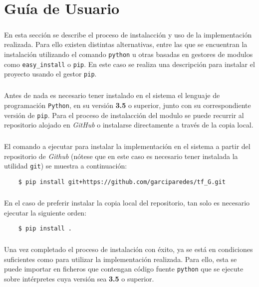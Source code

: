 \documentclass{subfiles}
\begin{document}
  \chapter{Guía de Usuario}
  \label{chap:user_guide}

    \paragraph{}
    En esta sección se describe el proceso de instalacción y uso de la implementación realizada. Para ello existen distintas alternativas, entre las que se encuentran la instalación utilizando el comando \texttt{python} u otras basadas en gestores de modulos como \texttt{easy\_install} o \texttt{pip}. En este caso se realiza una descripción para instalar el proyecto usando el gestor \texttt{pip}.

    \paragraph{}
    Antes de nada es necesario tener instalado en el sistema el lenguaje de programación \texttt{Python}, en su versión \textbf{3.5} o superior, junto con su correspondiente versión de \texttt{pip}. Para el proceso de instalacción del modulo se puede recurrir al repositorio alojado en \emph{GitHub} o instalarse directamente a través de la copia local.

    \paragraph{}
    El comando a ejecutar para instalar la implementación en el sistema a partir del repositorio de \emph{Github} (nótese que en este caso es necesario tener instalada la utilidad \texttt{git}) se muestra a continuación:
    \begin{verbatim}
    $ pip install git+https://github.com/garciparedes/tf_G.git
    \end{verbatim}

    \paragraph{}
    En el caso de preferir instalar la copia local del repositorio, tan solo es necesario ejecutar la siguiente orden:

    \begin{verbatim}
    $ pip install .
    \end{verbatim}

    \paragraph{}
    Una vez completado el proceso de instalación con éxito, ya se está en condiciones suficientes como para utilizar la implementación realizada. Para ello, esta se puede importar en ficheros que contengan código fuente \texttt{python} que se ejecute sobre intérpretes cuya versión sea \textbf{3.5} o superior.
\end{document}
